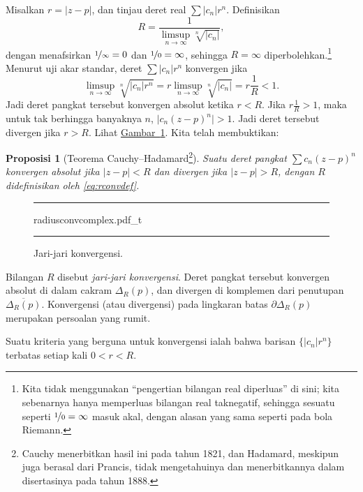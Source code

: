 \documentclass[12pt,openany]{book}
\newcommand{\sabs}[1]{\lvert {#1} \rvert}
\newcommand{\myindex}[1]{#1\index{#1}}
\newcommand{\myquote}[1]{``#1''}
\theoremstyle{plain}
\newtheorem{prop}[thm]{Proposisi}
\theoremstyle{remark}
\theoremstyle{definition}
\newenvironment{myfig}{%
\begin{figure}[h!t]
\noindent\rule{\textwidth}{0.5pt}\vspace{12pt}\par\centering}%
{\par\noindent\rule{\textwidth}{0.5pt}
\end{figure}}
\theoremstyle{exercise}
\theoremstyle{example}
\newcommand{\figureref}[1]{\hyperref[#1]{Gambar~\ref*{#1}}}
\begin{document}
Misalkan $r = \sabs{z-p}$, dan tinjau deret real $\sum \sabs{c_n} r^n$.  Definisikan
\begin{equation} \label{eq:rconvdef}
R = \frac{1}{\limsup\limits_{n \to \infty} \sqrt[n]{\sabs{c_n}}} ,
\end{equation}
dengan menafsirkan $\nicefrac{1}{\infty} = 0$ dan $\nicefrac{1}{0} = \infty$,
sehingga $R=\infty$ diperbolehkan.\footnote{%
Kita tidak menggunakan \myquote{pengertian bilangan real diperluas} di sini;
kita sebenarnya hanya memperluas bilangan real taknegatif, sehingga
sesuatu seperti $\nicefrac{1}{0}=\infty$ masuk akal, dengan alasan yang sama
seperti pada bola Riemann.}
Menurut uji akar standar, deret $\sum \sabs{c_n} r^n$
konvergen jika
\begin{equation*}
\limsup_{n \to \infty} \sqrt[n]{\sabs{c_n} r^n} = 
r \limsup_{n \to \infty} \sqrt[n]{\sabs{c_n}} = r \frac{1}{R} < 1 .
\end{equation*}
Jadi deret pangkat tersebut konvergen absolut ketika $r < R$.
Jika $r \frac{1}{R} > 1$, maka untuk tak berhingga banyaknya $n$,
$\sabs{c_n {(z-p)}^n} > 1$. Jadi deret tersebut
divergen jika $r > R$.
Lihat \figureref{fig:radiusconvcomplex}.
Kita telah membuktikan:

\begin{prop}[Teorema Cauchy--Hadamard\footnote{%
Cauchy menerbitkan hasil ini pada tahun 1821, dan Hadamard, meskipun juga berasal dari
Prancis, tidak mengetahuinya dan menerbitkannya dalam disertasinya pada tahun 1888.}]
Suatu deret pangkat $\sum c_n {(z-p)}^n$ konvergen absolut jika
$\sabs{z-p} < R$ dan divergen jika
$\sabs{z-p} > R$, dengan $R$ didefinisikan oleh \eqref{eq:rconvdef}.
\end{prop}

\begin{myfig}
{radiusconvcomplex.pdf_t}
\caption{Jari-jari konvergensi.\label{fig:radiusconvcomplex}}
\end{myfig}

Bilangan $R$ disebut \emph{\myindex{jari-jari konvergensi}}.
Deret pangkat tersebut konvergen absolut
di dalam cakram $\Delta_R(p)$, dan divergen
di komplemen dari penutupan $\overline{\Delta_R(p)}$.
Konvergensi (atau divergensi) pada lingkaran batas $\partial \Delta_R(p)$
merupakan persoalan yang rumit.

Suatu kriteria yang berguna untuk konvergensi ialah bahwa barisan
$\bigl\{ \sabs{c_n} r^n \bigr\}$
terbatas setiap kali $0 < r < R$.
\end{document}
